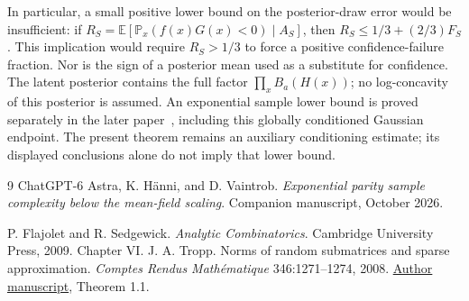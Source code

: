 \documentclass[11pt]{article}
\theoremstyle{remark}\newtheorem{remark}[theorem]{Remark}
\newcommand{\E}{\mathbb E}
\newcommand{\Pp}{\mathbb P}
\begin{document}
In particular, a small positive lower bound on the posterior-draw error would be insufficient: if $R_S=\E[\Pp_x(f(x)G(x)<0)\mid A_S]$, then $R_S\le1/3+(2/3)F_S$. This implication would require $R_S>1/3$ to force a positive confidence-failure fraction. Nor is the sign of a posterior mean used as a substitute for confidence. The latent posterior contains the full factor $\prod_xB_a(H(x))$; no log-concavity of this posterior is assumed. An exponential sample lower bound is proved separately in the later
paper~\cite{subcritical-exponential}, including this globally conditioned
Gaussian endpoint. The present theorem remains an auxiliary conditioning
estimate; its displayed conclusions alone do not imply that lower bound.

\appendix



\begin{thebibliography}{9}
ChatGPT-6 Astra, K. H\"anni, and D. Vaintrob.
\emph{Exponential parity sample complexity below the mean-field scaling}.
Companion manuscript, October 2026.

 P. Flajolet and R. Sedgewick. \emph{Analytic Combinatorics}. Cambridge University Press, 2009. Chapter VI.
 J. A. Tropp. Norms of random submatrices and sparse approximation. \emph{Comptes Rendus Math\'ematique} 346:1271--1274, 2008. \href{https://tropp.caltech.edu/papers/Tro08-Norms-Random-v3.pdf}{Author manuscript}, Theorem 1.1.
\end{thebibliography}
\end{document}

